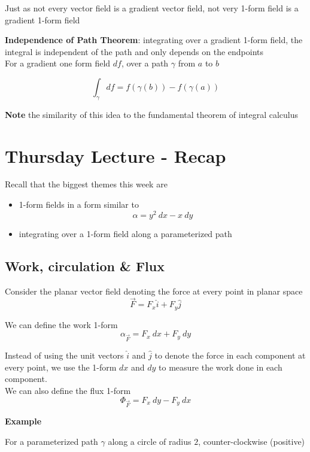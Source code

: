 Just as not every vector field is a gradient vector field, not very 1-form field is a gradient 1-form field \\

\begin{framed}
   \textbf{Independence of Path Theorem}: integrating over a gradient 1-form field, the integral is independent of the path and only depends on the endpoints \\

   For a gradient one form field $df$, over a path $\gamma$ from $a$ to $b$

   \[
      \int_{\gamma} df = f( \gamma(b)) - f(\gamma(a))
   \] 

   \textbf{Note} the similarity of this idea to the fundamental theorem of integral calculus
\end{framed}

\section{Thursday Lecture - Recap}

Recall that the biggest themes this week are
\begin{itemize}
   \item 1-form fields in a form similar to
      \[
        \alpha = y^2\ dx - x\ dy
      \] 
   \item integrating over a 1-form field along a parameterized path
\end{itemize}

\subsection{Work, circulation \& Flux}

Consider the planar vector field denoting the force at every point in planar space
\[
  \vec{F} = F_x \hat{i} + F_y \hat{j}
\] 

We can define the work 1-form
\[
   \alpha_{ \vec{F}} = F_x\ dx + F_y\ dy
\] 

Instead of using the unit vectors $ \hat{i}$ and $ \hat{ j}$ to denote the force in each component at every point, we use the 1-form $dx$ and $dy$ to measure the work done in each component. \\

We can also define the flux 1-form
\[
   \Phi_{ \vec{F}} = F_x\ dy - F_y\ dx
\] 

\textbf{Example}

For a parameterized path $\gamma$ along a circle of radius $2$, counter-clockwise (positive) \\

